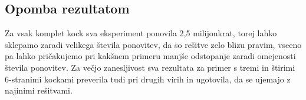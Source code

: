 \documentclass[12pt,a4paper]{amsart}
\begin{document}
\subsection{Opomba rezultatom}
Za vsak komplet kock sva eksperiment ponovila 2,5 milijonkrat, torej lahko sklepamo zaradi velikega števila ponovitev, da so rešitve zelo blizu pravim, vseeno pa lahko pričakujemo pri kakšnem primeru manjše odstopanje zaradi omejenosti števila ponovitev. Za večjo zanesljivost sva rezultata za primer s tremi in štirimi 6-stranimi kockami preverila tudi pri drugih virih in ugotovila, da se ujemajo z najinimi rešitvami.
\end{document}
